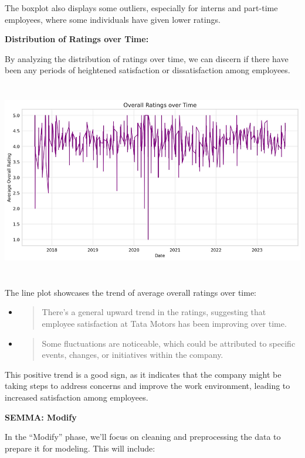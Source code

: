 \documentclass[
]{article}
\newcommand{\textcenter}[1]{\begin{center} \vspace{10px}\textbf{\large #1} \end{center}}
\begin{document}
The boxplot also displays some outliers, especially for interns and
part-time employees, where some individuals have given lower ratings.

\textbf{Distribution of Ratings over Time:}

By analyzing the distribution of ratings over time, we can discern if
there have been any periods of heightened satisfaction or
dissatisfaction among employees.

\includegraphics[width=5.26806in,height=3.40972in]{image9.png}

The line plot showcases the trend of average overall ratings over time:

\begin{itemize}
\item
  \begin{quote}
  There's a general upward trend in the ratings, suggesting that
  employee satisfaction at Tata Motors has been improving over time.
  \end{quote}
\item
  \begin{quote}
  Some fluctuations are noticeable, which could be attributed to
  specific events, changes, or initiatives within the company.
  \end{quote}
\end{itemize}

This positive trend is a good sign, as it indicates that the company
might be taking steps to address concerns and improve the work
environment, leading to increased satisfaction among employees.


\textcenter{SEMMA: Modify}

In the ``Modify'' phase, we'll focus on cleaning and preprocessing the
data to prepare it for modeling. This will include:
\end{document}
